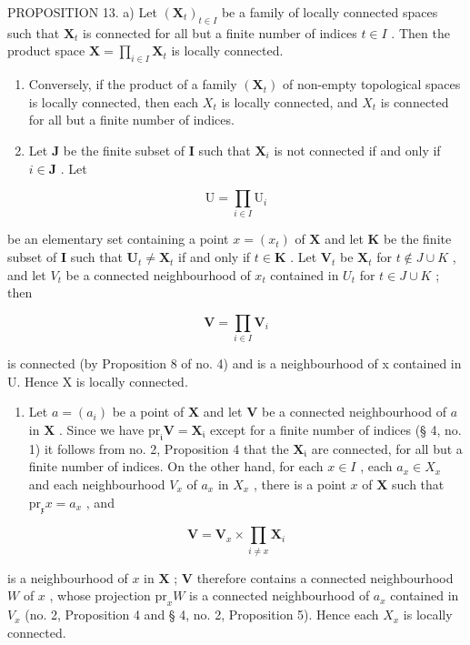 PROPOSITION 13. a) Let \((\mathbf{X}_t)_{t \in I}\) be a family of locally connected spaces such that \(\mathbf{X}_t\) is connected for all but a finite number of indices \(t \in I\) . Then the product space \(\mathbf{X} = \prod_{i \in I} \mathbf{X}_t\) is locally connected.

\begin{enumerate}
\def\labelenumi{\alph{enumi})}
\setcounter{enumi}{1}
\item
  Conversely, if the product of a family \((\mathbf{X}_{t})\) of non-empty topological spaces is locally connected, then each \(X_{t}\) is locally connected, and \(X_{t}\) is connected for all but a finite number of indices.
\item
  Let \(\mathbf{J}\) be the finite subset of \(\mathbf{I}\) such that \(\mathbf{X}_i\) is not connected if and only if \(i \in \mathbf{J}\) . Let
\end{enumerate}

\[
\mathrm{U} = \prod_ {i \in I} \mathrm{U} _ {i}
\]

be an elementary set containing a point \(x = (x_{t})\) of \(\mathbf{X}\) and let \(\mathbf{K}\) be the finite subset of \(\mathbf{I}\) such that \(\mathbf{U}_{t} \neq \mathbf{X}_{t}\) if and only if \(t \in \mathbf{K}\) . Let \(\mathbf{V}_{t}\) be \(\mathbf{X}_{t}\) for \(t \notin J \cup K\) , and let \(V_{t}\) be a connected neighbourhood of \(x_{t}\) contained in \(U_{t}\) for \(t \in J \cup K\) ; then

\[
\mathbf {V} = \prod_ {i \in I} \mathbf {V} _ {i}
\]

is connected (by Proposition 8 of no. 4) and is a neighbourhood of x contained in U. Hence X is locally connected.

\begin{enumerate}
\def\labelenumi{\alph{enumi})}
\setcounter{enumi}{1}
\tightlist
\item
  Let \(a = (a_{i})\) be a point of \(\mathbf{X}\) and let \(\mathbf{V}\) be a connected neighbourhood of \(a\) in \(\mathbf{X}\) . Since we have \(\mathrm{pr}_{\mathfrak{i}}\mathbf{V} = \mathbf{X}_{\mathfrak{i}}\) except for a finite number of indices (§ 4, no. 1) it follows from no. 2, Proposition 4 that the \(\mathbf{X}_{\mathfrak{i}}\) are connected, for all but a finite number of indices. On the other hand, for each \(x \in I\) , each \(a_{x} \in X_{x}\) and each neighbourhood \(V_{x}\) of \(a_{x}\) in \(X_{x}\) , there is a point \(x\) of \(\mathbf{X}\) such that \(\mathrm{pr}_{\mathfrak{x}}x = a_{x}\) , and
\end{enumerate}

\[
\mathbf {V} = \mathbf {V} _ {x} \times \prod_ {i \neq x} \mathbf {X} _ {i}
\]

is a neighbourhood of \(x\) in \(\mathbf{X}\) ; \(\mathbf{V}\) therefore contains a connected neighbourhood \(W\) of \(x\) , whose projection \(\mathrm{pr}_xW\) is a connected neighbourhood of \(a_x\) contained in \(V_x\) (no. 2, Proposition 4 and § 4, no. 2, Proposition 5). Hence each \(X_x\) is locally connected.

